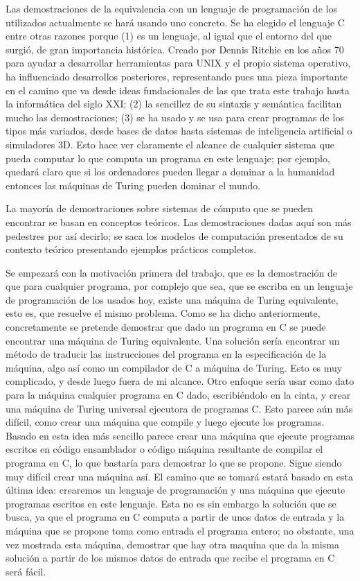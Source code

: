 Las demostraciones de la equivalencia con un lenguaje de programación de los utilizados actualmente
se hará usando uno concreto. Se ha elegido el lenguaje C entre otras razones porque (1) es un
lenguaje, al igual que el entorno del que surgió, de gran importancia histórica. Creado por Dennis
Ritchie en los años 70 para ayudar a desarrollar herramientas para UNIX y el propio sistema
operativo, ha influenciado desarrollos posteriores, representando pues una pieza importante en el
camino que va desde ideas fundacionales de las que trata este trabajo hasta la informática del siglo
XXI; (2) la sencillez de su sintaxis y semántica facilitan mucho las demostraciones; (3) se ha usado
y se usa para crear programas de los tipos más variados, desde bases de datos hasta sistemas de
inteligencia artificial o simuladores 3D. Esto hace ver claramente el alcance de cualquier sistema
que pueda computar lo que computa un programa en este lenguaje; por ejemplo, quedará claro que si
los ordenadores pueden llegar a dominar a la humanidad entonces las máquinas de Turing pueden
dominar el mundo.

La mayoría de demostraciones sobre sistemas de cómputo que se pueden encontrar se basan en conceptos
teóricos. Las demostraciones dadas aquí son más pedestres por así decirlo; se saca los modelos de
computación presentados de su contexto teórico presentando ejemplos prácticos completos.

Se empezará con la motivación primera del trabajo, que es la demostración de que para cualquier
programa, por complejo que sea, que se escriba en un lenguaje de programación de los usados hoy,
existe una máquina de Turing equivalente, esto es, que resuelve el mismo problema. Como se ha dicho
anteriormente, concretamente se pretende demostrar que dado un programa en C se puede encontrar una
máquina de Turing equivalente.  Una solución sería encontrar un método de traducir las instrucciones
del programa en la especificación de la máquina, algo así como un compilador de C a máquina de
Turing. Esto es muy complicado, y desde luego fuera de mi alcance. Otro enfoque sería usar como dato
para la máquina cualquier programa en C dado, escribiéndolo en la cinta, y crear una máquina de
Turing universal ejecutora de programas C. Esto parece aún más difícil, como crear una máquina que
compile y luego ejecute los programas. Basado en esta idea más sencillo parece crear una máquina que
ejecute programas escritos en código ensamblador o código máquina resultante de compilar el programa
en C, lo que bastaría para demostrar lo que se propone. Sigue siendo muy difícil crear una máquina
así. El camino que se tomará estará basado en esta última idea: crearemos un lenguaje de
programación y una máquina que ejecute programas escritos en este lenguaje.  Esta no es sin embargo
la solución que se busca, ya que el programa en C computa a partir de unos datos de entrada y la
máquina que se propone toma como entrada el programa entero; no obstante, una vez mostrada esta
máquina, demostrar que hay otra maquina que da la misma solución a partir de los mismos datos de
entrada que recibe el programa en C será fácil.

